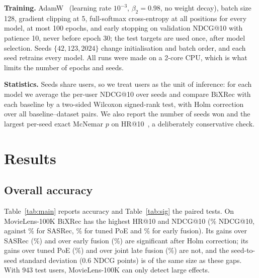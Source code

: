 \documentclass[conference]{IEEEtran}
\begin{document}
\textbf{Training.} AdamW~\cite{loshchilov2019adamw} (learning rate $10^{-3}$, $\beta_2=0.98$, no weight decay), batch
size 128, gradient clipping at 5, full-softmax cross-entropy at all positions for every model, at most 100 epochs,
and early stopping on validation NDCG@10 with patience 10, never before epoch 30; the test targets are used once,
after model selection. Seeds $\{42,123,2024\}$ change initialisation and batch order, and each seed retrains every
model. All runs were made on a 2-core CPU, which is what limits the number of epochs and seeds.

\textbf{Statistics.} Seeds share users, so we treat users as the unit of inference: for each model we average the
per-user NDCG@10 over seeds and compare BiXRec with each baseline by a two-sided Wilcoxon signed-rank test, with
Holm correction~\cite{holm1979} over all baseline--dataset pairs. We also report the number of seeds won and the
largest per-seed exact McNemar $p$ on HR@10~\cite{mcnemar1947}, a deliberately conservative check.

\section{Results}\label{sec:results}

\tabMain
\tabSig

\subsection{Overall accuracy}
Table~\ref{tab:main} reports accuracy and Table~\ref{tab:sig} the paired tests. On MovieLens-100K BiXRec has the
highest HR@10 and NDCG@10 (\resMlHundredBixNdcg\% NDCG@10, against \resMlHundredSasrecNdcg\% for SASRec,
\resMlHundredPoeNdcg\% for tuned PoE and \resMlHundredHybridNdcg\% for early fusion). Its gains over SASRec
(\gainMlHundredSasrec\%) and over early fusion (\gainMlHundredHybrid\%) are significant after Holm correction; its
gains over tuned PoE (\gainMlHundredPoe\%) and over joint late fusion (\gainMlHundredLate\%) are not, and the
seed-to-seed standard deviation (0.6 NDCG points) is of the same size as these gaps. With 943 test users,
MovieLens-100K can only detect large effects.
\end{document}
